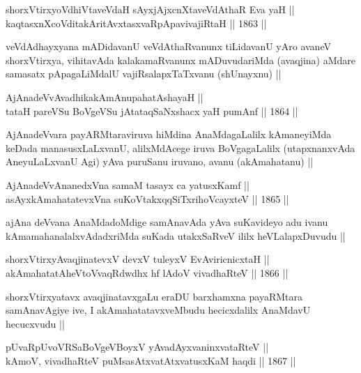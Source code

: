 \begin{shl}
shorxVtirxyoV\s dhiVtaveVdaH sAyxjAjxcnXtaveVdAthaR Eva yaH || \\
kaqtasxnXcoVditakAritAvxtasxvaRpApavivajiRtaH ||  1863 ||  
\end{shl}

\begin{artha}
veVdAdhayxyana mADidavanU veVdAthaRvanunx tiLidavanU yAro avaneV
shorxVtirxya, vihitavAda kalakamaRvanunx mADuvudariMda (avaqjina)
aMdare samasatx pApagaLiMdalU vajiRsalapxTaTxvanu (shUnayxnu) ||
\end{artha}


\begin{shl}
AjAnadeVvAvadhikakAmAnupahatAshayaH || \\
tataH pareVSu BoVgeVSu jAtataqSaNxshacx yaH pumAnf ||  1864 ||  
\end{shl}

\begin{artha}
AjAnadeVvara payARMtaraviruva hiMdina AnaMdagaLalilx kAmaneyiMda
keDada manasusxLaLxvanU, alilxMdAcege iruva BoVgagaLalilx
(utapxnanxvAda AneyuLaLxvanU Agi) yAva puruSanu iruvano, avanu
(akAmahatanu) ||
\end{artha}

\begin{shl}
AjAnadeVvAnanedxVna samaM tasayx ca yatusxKamf ||  \\
asAyxkAmahatatevxVna suKoVtakxqqSiTxrihoVcayxteV ||  1865 ||  
\end{shl}

\begin{artha}
ajAna deVvana AnaMdadoMdige samAnavAda yAva suKavideyo adu ivanu
kAmamahanalalxvAdadxriMda suKada utakxSaRveV ililx heVLalapxDuvudu ||
\end{artha}

\begin{shl}
shorxVtirxyAvaqjinatevxV devxV tuleyxV EvA\s \s viricnicxtaH || \\
akAmahatatAheVtoVvaqRdwdhx hf lAdoV vivadhaRteV ||  1866 ||  
\end{shl}

\begin{artha}
shorxVtirxyatavx avaqjinatavxgaLu eraDU barxhamxna payaRMtara
samAnavAgiye ive, I akAmahatatavxveMbudu hecicxdalilx AnaMdavU
hecucxvudu ||
\end{artha}

\begin{shl}
pUvaRpUvoVRSaBoVgeVBoyxV yAvadAyxvaninxvataRteV || \\
kAmoV, vivadhaRteV puMsasAtxvatAtxvatusxKaM haqdi ||  1867 ||  
\end{shl}

